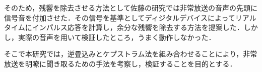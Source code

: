 \documentclass[a4j,11pt]{jsarticle}
\begin{document}
そのため，残響を除去させる方法として佐藤の研究では非常放送の音声の先頭に信号音を付加させた\cite{oka2}．その信号を基準としてディジタルデバイスによってリアルタイムにインパルス応答を計算し，余分な残響を除去する方法を提案した．しかし，実際の音声を用いて検証したところ，うまく動作しなかった．

そこで本研究では，逆畳込みとケプストラム法を組み合わせることにより，非常放送を明瞭に聞き取るための手法を考察し，検証することを目的とする．



\newpage

\end{document}
